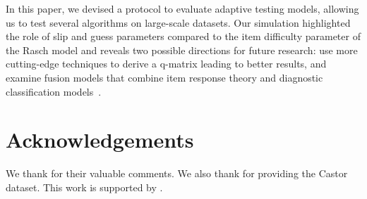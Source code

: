 \documentclass{edm_template}
\begin{document}

In this paper, we devised a protocol to evaluate adaptive testing models, allowing us to test several algorithms on large-scale datasets. Our simulation highlighted the role of slip and guess parameters compared to the item difficulty parameter of the Rasch model and reveals two possible directions for future research: use more cutting-edge techniques to derive a q-matrix leading to better results, and examine fusion models that combine item response theory and diagnostic classification models~\cite{McGlohen2008,Bradshaw2014}.







\newpage

\section{Acknowledgements}

We thank \phantom{Chia-Tche Chang, Le Thanh Dung Nguyen and especially Antoine Amarilli} for their valuable comments. We also thank \phantom{Mathias Hiron} for providing the Castor dataset. This work is supported by \phantom{the Paris-Saclay Institut de la Société Numérique funded by the IDEX Paris-Saclay, ANR-11-IDEX-0003-02}.

%

%
%
\end{document}
